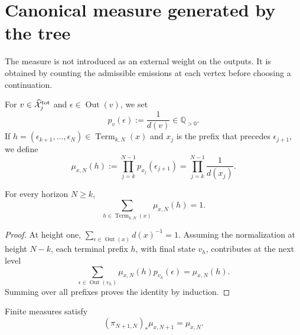 \section{Canonical measure generated by the tree}
\label{sec:continuo-comun-medida}

The measure is not introduced as an external weight on the outputs.  It is obtained
by counting the admissible emissions at each vertex before choosing a
continuation.

\begin{definition}
\label{def:continuo-comun-medida-finita}
For \(v\in\widehat{\mathcal X}^{\rm tot}_j\) and
\(\epsilon\in\operatorname{Out}(v)\), we set
\begin{equation}
\label{eq:continuo-comun-peso-local}
 p_v(\epsilon):=\frac{1}{d(v)}\in\mathbb Q_{>0}.
\end{equation}
If
\(h=(\epsilon_{k+1},\ldots,\epsilon_N)\in
\operatorname{Term}_{k,N}(x)\) and \(x_j\) is the prefix that precedes
\(\epsilon_{j+1}\), we define
\begin{equation}
\label{eq:continuo-comun-medida-horizonte}
 \mu_{x,N}(h)
 :=\prod_{j=k}^{N-1}p_{x_j}(\epsilon_{j+1})
 =\prod_{j=k}^{N-1}\frac{1}{d(x_j)}.
\end{equation}
\end{definition}

\begin{lemma}[Normalization]
\label{lem:continuo-comun-medida-normalizada}
For every horizon \(N\geq k\),
\begin{equation}
\label{eq:continuo-comun-medida-suma-uno}
 \sum_{h\in\operatorname{Term}_{k,N}(x)}\mu_{x,N}(h)=1.
\end{equation}
\end{lemma}

\begin{proof}
At height one,
\(\sum_{\epsilon\in\operatorname{Out}(x)}d(x)^{-1}=1\).  Assuming the
normalization at height \(N-k\), each terminal prefix \(h\), with final state
\(v_h\), contributes at the next level
\[
 \sum_{\epsilon\in\operatorname{Out}(v_h)}
 \mu_{x,N}(h)p_{v_h}(\epsilon)
 =\mu_{x,N}(h).
\]
Summing over all prefixes proves the identity by induction.
\end{proof}

\begin{proposition}
\label{prop:continuo-comun-medida-consistente}
Finite measures satisfy
\begin{equation}
\label{eq:continuo-comun-medida-pushforward}
 (\pi_{N+1,N})_*\mu_{x,N+1}=\mu_{x,N}.
\end{equation}
\end{proposition}

